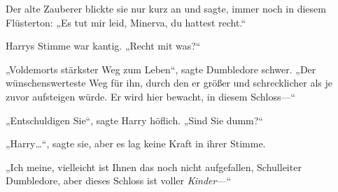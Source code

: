Der alte Zauberer blickte sie nur kurz an und sagte, immer noch in diesem Flüsterton:
„Es tut mir leid, Minerva, du hattest recht.“

Harrys Stimme war kantig. „Recht mit was?“

„Voldemorts stärkster Weg zum Leben“, sagte Dumbledore schwer. „Der wünschenswerteste Weg für ihn, durch den er größer und schrecklicher als je zuvor aufsteigen würde. Er wird hier bewacht, in diesem Schloss—“

„Entschuldigen Sie“, sagte Harry höflich. „Sind Sie dumm?“

„Harry…“, sagte sie, aber es lag keine Kraft in ihrer Stimme.

„Ich meine, vielleicht ist Ihnen das noch nicht aufgefallen, Schulleiter Dumbledore, aber dieses Schloss ist voller \emph{Kinder}—“

